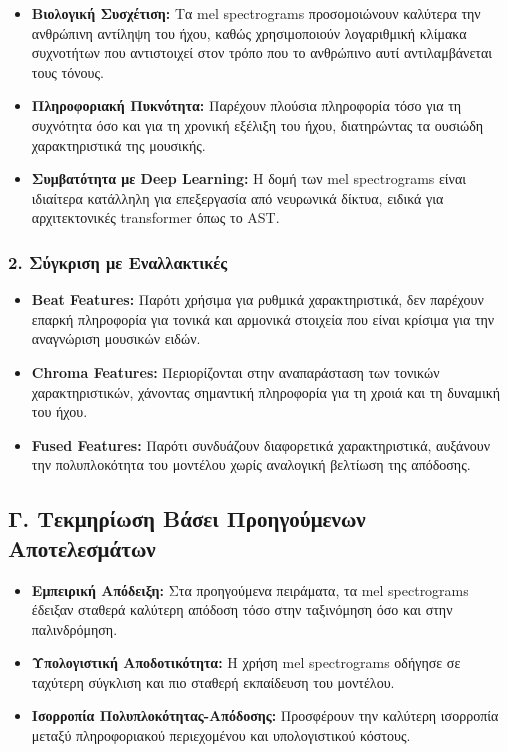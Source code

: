 \documentclass[a4paper,12pt]{article}
\begin{document}
\begin{itemize}
    \item \textbf{Βιολογική Συσχέτιση:} Τα mel spectrograms προσομοιώνουν καλύτερα την ανθρώπινη αντίληψη του ήχου, καθώς χρησιμοποιούν λογαριθμική κλίμακα συχνοτήτων που αντιστοιχεί στον τρόπο που το ανθρώπινο αυτί αντιλαμβάνεται τους τόνους.

    \item \textbf{Πληροφοριακή Πυκνότητα:} Παρέχουν πλούσια πληροφορία τόσο για τη συχνότητα όσο και για τη χρονική εξέλιξη του ήχου, διατηρώντας τα ουσιώδη χαρακτηριστικά της μουσικής.

    \item \textbf{Συμβατότητα με Deep Learning:} Η δομή των mel spectrograms είναι ιδιαίτερα κατάλληλη για επεξεργασία από νευρωνικά δίκτυα, ειδικά για αρχιτεκτονικές transformer όπως το AST.
\end{itemize}

\subsubsection*{2. Σύγκριση με Εναλλακτικές}

\begin{itemize}
    \item \textbf{Beat Features:} Παρότι χρήσιμα για ρυθμικά χαρακτηριστικά, δεν παρέχουν επαρκή πληροφορία για τονικά και αρμονικά στοιχεία που είναι κρίσιμα για την αναγνώριση μουσικών ειδών.

    \item \textbf{Chroma Features:} Περιορίζονται στην αναπαράσταση των τονικών χαρακτηριστικών, χάνοντας σημαντική πληροφορία για τη χροιά και τη δυναμική του ήχου.

    \item \textbf{Fused Features:} Παρότι συνδυάζουν διαφορετικά χαρακτηριστικά, αυξάνουν την πολυπλοκότητα του μοντέλου χωρίς αναλογική βελτίωση της απόδοσης.
\end{itemize}

\subsection*{Γ. Τεκμηρίωση Βάσει Προηγούμενων Αποτελεσμάτων}

\begin{itemize}
    \item \textbf{Εμπειρική Απόδειξη:} Στα προηγούμενα πειράματα, τα mel spectrograms έδειξαν σταθερά καλύτερη απόδοση τόσο στην ταξινόμηση όσο και στην παλινδρόμηση.

    \item \textbf{Υπολογιστική Αποδοτικότητα:} Η χρήση mel spectrograms οδήγησε σε ταχύτερη σύγκλιση και πιο σταθερή εκπαίδευση του μοντέλου.

    \item \textbf{Ισορροπία Πολυπλοκότητας-Απόδοσης:} Προσφέρουν την καλύτερη ισορροπία μεταξύ πληροφοριακού περιεχομένου και υπολογιστικού κόστους.
\end{itemize}
\end{document}
